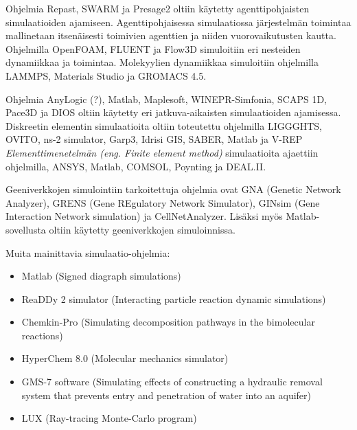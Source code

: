 \documentclass[utf8]{gradu3}
\begin{document}
Ohjelmia Repast, SWARM ja Presage2 oltiin käytetty agenttipohjaisten simulaatioiden ajamiseen.
Agenttipohjaisessa simulaatiossa järjestelmän toimintaa mallinetaan itsenäisesti toimivien
agenttien ja niiden vuorovaikutusten kautta.
Ohjelmilla OpenFOAM, FLUENT ja Flow3D simuloitiin eri nesteiden dynamiikkaa ja toimintaa.
Molekyylien dynamiikkaa simuloitiin ohjelmilla 
LAMMPS, Materials Studio ja GROMACS 4.5.

Ohjelmia AnyLogic (?), Matlab, Maplesoft, WINEPR-Simfonia, SCAPS 1D, Pace3D ja DIOS 
oltiin käytetty eri jatkuva-aikaisten simulaatioiden ajamisessa.
Diskreetin elementin simulaatioita oltiin toteutettu ohjelmilla
LIGGGHTS, OVITO, ns-2 simulator, Garp3, Idrisi GIS, SABER, Matlab ja V-REP
\textit{Elementtimenetelmän (eng. Finite element method)} simulaatioita
ajaettiin ohjelmilla, ANSYS, Matlab, COMSOL, Poynting ja DEAL.II.

Geeniverkkojen simulointiin tarkoitettuja ohjelmia ovat
GNA (Genetic Network Analyzer), 
GRENS (Gene REgulatory Network Simulator),
GINsim (Gene Interaction Network simulation) ja CellNetAnalyzer.
Lisäksi myös Matlab-sovellusta oltiin käytetty geeniverkkojen simuloinnissa.

Muita mainittavia simulaatio-ohjelmia:
\begin{itemize}
    \item Matlab (Signed diagraph simulations)
    \item ReaDDy 2 simulator (Interacting particle reaction dynamic simulations)
    \item Chemkin-Pro (Simulating decomposition pathways in the bimolecular reactions)
    \item HyperChem 8.0 (Molecular mechanics simulator)
    \item GMS-7 software (Simulating effects of constructing a hydraulic removal system that prevents entry and penetration of water into an aquifer)
    \item LUX (Ray-tracing Monte-Carlo program)
\end{itemize}
\end{document}
